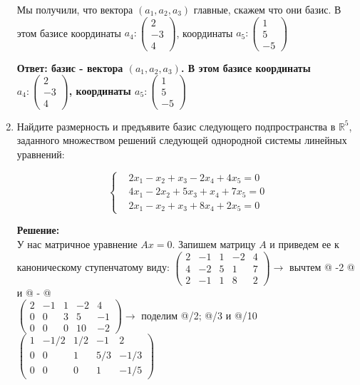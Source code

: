 \documentclass[a4paper,12pt]{article}
\makeatletter
\newcommand*{\rom}[1]{\expandafter\@slowromancap\romannumeral #1@}
\makeatother
\begin{document}
\begin{enumerate}
Мы получили, что вектора $(a_1,a_2,a_3)$ главные, скажем что они базис. В этом базисе координаты $a_4:\begin{pmatrix}2\\-3\\4
\end{pmatrix}$, координаты $a_5:\begin{pmatrix}1\\5\\-5
\end{pmatrix}$

\textbf{Ответ: базис - вектора $(a_1,a_2,a_3)$.  В этом базисе координаты $a_4:\begin{pmatrix}2\\-3\\4
\end{pmatrix}$, координаты $a_5:\begin{pmatrix}1\\5\\-5
\end{pmatrix}$}

\item Найдите размерность и предъявите базис следующего подпространства в $\mathbb{R}^5$, заданного множеством решений следующей однородной системы линейных уравнений:

\[
\left\{
\begin{aligned}
& 2x_1 - x_2 + x_3 - 2x_4 + 4x_5 = 0\\
& 4x_1 - 2x_2 + 5x_3 + x_4 + 7x_5 = 0\\
& 2x_1 - x_2 + x_3 + 8x_4 + 2x_5 = 0
\end{aligned}
\right.
\]

\vspace{5pt}
\textbf{Решение:}\\
У нас матричное уравнение $Ax=0$. Запишем матрицу $A$ и приведем ее к каноническому ступенчатому виду:
$
\left(\begin{array}{ccccc}  
2&-1&1&-2&4\\
4&-2&5&1&7\\
2&-1&1&8&2
\end{array}\right) \rightarrow$ вычтем \rom{2} -2 \rom{1} и \rom{3} - \rom{1}\\
$
\left(\begin{array}{ccccc}  
2&-1&1&-2&4\\
0&0&3&5&-1\\
0&0&0&10&-2
\end{array}\right) \rightarrow$ поделим \rom{1}/2; \rom{2}/3 и \rom{3}/10\\
$
\left(\begin{array}{ccccc}  
1&-1/2&1/2&-1&2\\
0&0&1&5/3&-1/3\\
0&0&0&1&-1/5
\end{array}\right)$


\end{enumerate}
\end{document}
